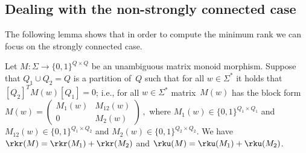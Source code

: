 \subsection{Dealing with the non-strongly connected case}\label{subsec:non-sc}

The following lemma shows that in order to compute the minimum rank we can focus on the strongly connected case.

\begin{prop} \label{prop:unamb-sc}
Let $M : \Sigma \to \{0,1\}^{Q \times Q}$ be an unambiguous matrix monoid morphism.
Suppose that $Q_1 \cup Q_2 = Q$ is a partition of~$Q$ such that for all $w \in \Sigma^*$ it holds that $[Q_2]^T M(w) [Q_1] = 0$; i.e., for all $w \in \Sigma^*$ matrix~$M(w)$ has the block form
$
M(w) = \begin{pmatrix}
    M_1(w) & M_{12}(w) \\ 0 & M_2(w)
\end{pmatrix}\,,
$
where $M_1(w) \in \{0,1\}^{Q_1 \times Q_1}$ and $M_{12}(w) \in \{0,1\}^{Q_1 \times Q_2}$ and $M_2(w) \in \{0,1\}^{Q_2 \times Q_2}$.
We have $\rkr(M) = \rkr(M_1) + \rkr(M_2)$ and $\rku(M) = \rku(M_1) + \rku(M_2)$. %
\end{prop}
